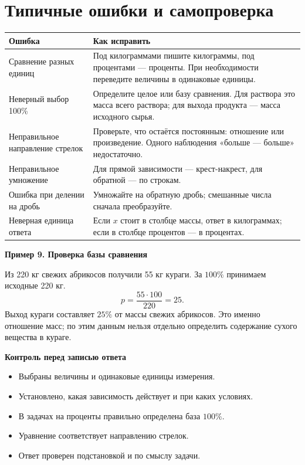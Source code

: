 \documentclass[a4paper,12pt]{article}
\newcommand{\ex}[1]{\par\smallskip\textcolor{darkaccent}{\textbf{#1}}\par}
\begin{document}
\section{Типичные ошибки и самопроверка}
\begin{tabularx}{\linewidth}{@{}>{\raggedright\arraybackslash}p{.35\linewidth}X@{}}
\toprule Ошибка & Как исправить\\\midrule
Сравнение разных единиц & Под килограммами пишите килограммы, под процентами — проценты. При необходимости переведите величины в одинаковые единицы.\\
Неверный выбор 100\% & Определите целое или базу сравнения. Для раствора это масса всего раствора; для выхода продукта — масса исходного сырья.\\
Неправильное направление стрелок & Проверьте, что остаётся постоянным: отношение или произведение. Одного наблюдения «больше — больше» недостаточно.\\
Неправильное умножение & Для прямой зависимости — крест-накрест, для обратной — по строкам.\\
Ошибка при делении на дробь & Умножайте на обратную дробь; смешанные числа сначала преобразуйте.\\
Неверная единица ответа & Если $x$ стоит в столбце массы, ответ в килограммах; если в столбце процентов — в процентах.\\
\bottomrule
\end{tabularx}
\ex{Пример 9. Проверка базы сравнения}
Из 220 кг свежих абрикосов получили 55 кг кураги. За $100\%$ принимаем исходные 220 кг.
\[p=\frac{55\cdot100}{220}=25.\]
Выход кураги составляет $25\%$ от массы свежих абрикосов. Это именно отношение масс; по этим данным нельзя отдельно определить содержание сухого вещества в кураге.
\ex{Контроль перед записью ответа}
\begin{itemize}[label=$\square$]
\item Выбраны величины и одинаковые единицы измерения.
\item Установлено, какая зависимость действует и при каких условиях.
\item В задачах на проценты правильно определена база $100\%$.
\item Уравнение соответствует направлению стрелок.
\item Ответ проверен подстановкой и по смыслу задачи.
\end{itemize}
\clearpage
\end{document}
